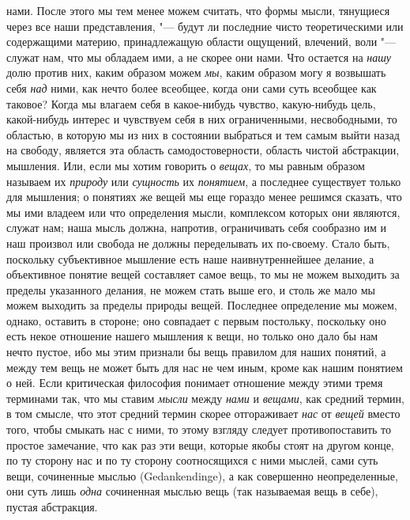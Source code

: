 нами. После этого мы тем менее можем считать, что формы мысли, тянущиеся через
все наши представления, "--- будут ли последние чисто теоретическими или
содержащими материю, принадлежащую области ощущений, влечений, воли "--- служат
нам, что мы обладаем ими, а не скорее они нами. Что остается на {\em нашу} долю
против них, каким образом можем {\em мы}, каким образом могу я возвышать себя
{\em над} ними, как нечто более всеобщее, когда они сами суть всеобщее как
таковое? Когда мы влагаем себя в какое-нибудь чувство, какую-нибудь цель,
какой-нибудь интерес и чувствуем себя в них ограниченными, несвободными, то
областью, в которую мы из них в состоянии выбраться и тем самым выйти назад на
свободу, является эта область самодостоверности, область чистой абстракции,
мышления. Или, если мы хотим говорить о {\em вещах}, то мы равным образом
называем их {\em природу} или {\em сущность} их {\em понятием}, а последнее
существует только для мышления; о понятиях же вещей мы еще гораздо менее
решимся сказать, что мы ими владеем или что определения мысли, комплексом
которых они являются, служат нам; наша мысль должна, напротив, ограничивать
себя сообразно им и наш произвол или свобода не должны переделывать их
по-своему. Стало быть, поскольку субъективное мышление есть наше
наивнутреннейшее делание, а объективное понятие вещей составляет самое вещь, то
мы не можем выходить за пределы указанного делания, не можем стать выше его, и
столь же мало мы можем выходить за пределы природы вещей. Последнее определение
мы можем, однако, оставить в стороне; оно совпадает с первым постольку,
поскольку оно есть некое отношение нашего мышления к вещи, но только оно дало
бы нам нечто пустое, ибо мы этим признали бы вещь правилом для наших понятий, а
между тем вещь не может быть для нас не чем иным, кроме как нашим понятием о
ней. Если критическая философия понимает отношение между этими тремя терминами
так, что мы ставим {\em мысли} между {\em нами} и {\em вещами}, как средний
термин, в том смысле, что этот средний термин скорее отгораживает {\em нас} от
{\em вещей} вместо того, чтобы смыкать нас с ними, то этому взгляду следует
противопоставить то простое замечание, что как раз эти вещи, которые якобы
стоят на другом конце, по ту сторону нас и по ту сторону соотносящихся с ними
мыслей, сами суть вещи, сочиненные мыслью (Gedank\-end\-inge), а как совершенно
неопределенные, они суть лишь {\em одна} сочиненная мыслью вещь (так называемая
вещь в себе), пустая абстракция.

